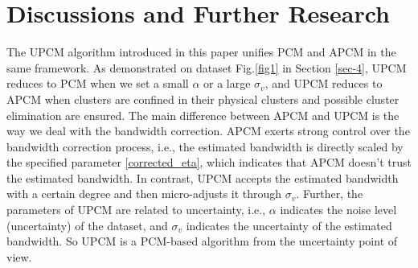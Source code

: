 \documentclass[journal]{IEEEtran}
\theoremstyle{definition}
\begin{document}
\section{Discussions and Further Research}
\label{sec-5}
The UPCM algorithm introduced in this paper unifies PCM and APCM in the same framework. As demonstrated on dataset Fig.\ref{fig1} in Section \ref{sec-4}, UPCM reduces to PCM when we set a small $\alpha$ or a large $\sigma_v$, and UPCM reduces to APCM when clusters are confined in their physical clusters and possible cluster elimination are ensured.
The main difference between APCM and UPCM is the way we deal with the bandwidth correction.
APCM exerts strong control over the bandwidth correction process, i.e., the estimated bandwidth is directly scaled by the specified parameter \ref{corrected_eta}, which indicates that APCM doesn't trust the estimated bandwidth. In contrast, UPCM accepts the estimated bandwidth with a certain degree and then micro-adjusts it through $\sigma_v$. Further, the parameters of UPCM are related to uncertainty, i.e., $\alpha$ indicates the noise level (uncertainty) of the dataset, and $\sigma_v$ indicates the uncertainty of the estimated bandwidth. So UPCM is a PCM-based algorithm from the uncertainty point of view.
\end{document}
